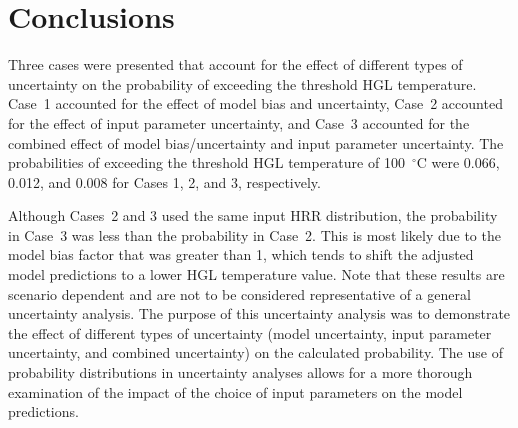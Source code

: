 \documentclass[12pt]{article}
\begin{document}
\clearpage


\section{Conclusions}
\label{sec:conclusions}

Three cases were presented that account for the effect of different types of uncertainty on the probability of exceeding the threshold HGL temperature. Case~1 accounted for the effect of model bias and uncertainty, Case~2 accounted for the effect of input parameter uncertainty, and Case~3 accounted for the combined effect of model bias/uncertainty and input parameter uncertainty. The probabilities of exceeding the threshold HGL temperature of 100~$^\circ$C were 0.066, 0.012, and 0.008 for Cases 1, 2, and 3, respectively.

Although Cases~2 and 3 used the same input HRR distribution, the probability in Case~3 was less than the probability in Case~2. This is most likely due to the model bias factor that was greater than 1, which tends to shift the adjusted model predictions to a lower HGL temperature value. Note that these results are scenario dependent and are not to be considered representative of a general uncertainty analysis. The purpose of this uncertainty analysis was to demonstrate the effect of different types of uncertainty (model uncertainty, input parameter uncertainty, and combined uncertainty) on the calculated probability. The use of probability distributions in uncertainty analyses allows for a more thorough examination of the impact of the choice of input parameters on the model predictions.




\end{document}
